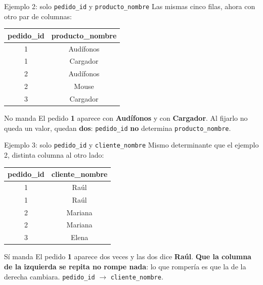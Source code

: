 \documentclass[aspectratio=169,10pt,c]{beamer}
\newcommand{\fdep}{$\rightarrow$}
\begin{document}
\begin{frame}{Ejemplo 2: solo \texttt{pedido\_id} y \texttt{producto\_nombre}}
\small Las mismas cinco filas, ahora con otro par de columnas:
\vspace{0.25cm}
\begin{center}
\small
\begin{tabular}{cc}
\toprule
\bfseries pedido\_id & \bfseries producto\_nombre \\
\midrule
1 & Audífonos \\
1 & Cargador \\
2 & Audífonos \\
2 & Mouse \\
3 & Cargador \\
\bottomrule
\end{tabular}
\end{center}
\vspace{0.25cm}
\begin{alertblock}{No manda}
\small El pedido \textbf{1} aparece con \textbf{Audífonos} y con \textbf{Cargador}. Al fijarlo no queda un valor, quedan \textbf{dos}: \texttt{pedido\_id} \textbf{no} determina \texttt{producto\_nombre}.
\end{alertblock}
\end{frame}

\begin{frame}{Ejemplo 3: solo \texttt{pedido\_id} y \texttt{cliente\_nombre}}
\small Mismo determinante que el ejemplo 2, distinta columna al otro lado:
\vspace{0.25cm}
\begin{center}
\small
\begin{tabular}{cc}
\toprule
\bfseries pedido\_id & \bfseries cliente\_nombre \\
\midrule
1 & Raúl \\
1 & Raúl \\
2 & Mariana \\
2 & Mariana \\
3 & Elena \\
\bottomrule
\end{tabular}
\end{center}
\vspace{0.25cm}
\begin{exampleblock}{Sí manda}
\small El pedido \textbf{1} aparece dos veces y las dos dice \textbf{Raúl}. \textbf{Que la columna de la izquierda se repita no rompe nada}: lo que rompería es que la de la derecha cambiara. \texttt{pedido\_id} \fdep{} \texttt{cliente\_nombre}.
\end{exampleblock}
\end{frame}
\end{document}
